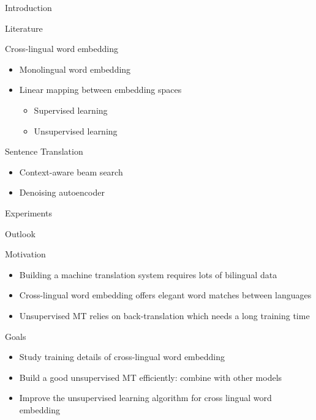 \documentclass[11pt, a4paper, landscape]{article}
\begin{document}
	\TitlePage
	
	\NewPage
	
	
	\vfill
	\begin{description}
		\item Introduction
		\item Literature
		\item Cross-lingual word embedding
		\begin{itemize}
			\item Monolingual word embedding
			\item Linear mapping between embedding spaces 
			\begin{itemize}
				\item Supervised learning
				\item Unsupervised learning
			\end{itemize}
		\end{itemize}
		\item Sentence Translation
		\begin{itemize}
			\item Context-aware beam search
			\item Denoising autoencoder
		\end{itemize}
		\item Experiments

		\item Outlook
	\end{description}
	\vfill
	
	\NewPage
	
	\vfill
	\begin{description}
		\item Motivation
		\begin{itemize}
			\item Building a machine translation system requires lots of bilingual data
			\item Cross-lingual word embedding offers elegant word matches between languages
			\item Unsupervised MT relies on back-translation which needs a long training time
		\end{itemize}
		\item Goals
		\begin{itemize}
			\item Study training details of cross-lingual word embedding
			\item Build a good unsupervised MT efficiently: combine with other models
			\item Improve the unsupervised learning algorithm for cross lingual word embedding
		\end{itemize}
		
	\end{description}
	\vfill
	
\end{document}
